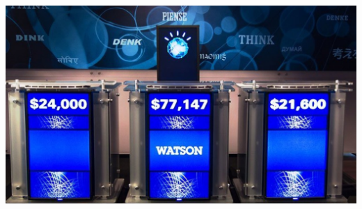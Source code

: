 \documentclass{article}
\begin{document}
\begin{multicols}{2}
\vspace{10pt}
\begin{minipage}{\linewidth}
    \includegraphics[width=1\linewidth]{n.jpeg} 
    \label{fig:Şekil tekrar}
\end{minipage}


\end{multicols}
\end{document}
